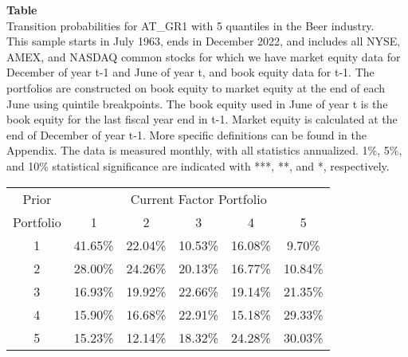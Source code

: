 \begin{table*}[ht!]
\raggedright
{}
\label{tab: transition_probs_AT_GR1_Beer_with_5_quantiles}
\textbf{Table \thetable} \\
Transition probabilities for AT_GR1 with 5 quantiles in the Beer industry. \\
\hspace*{1em}This sample starts in July 1963, ends in December 2022, and includes all NYSE, AMEX, and NASDAQ common stocks for which we have market equity data for December of year t-1 and June of year t, and book equity data for t-1. The portfolios are constructed on book equity to market equity at the end of each June using quintile breakpoints.  The book equity used in June of year t is the book equity for the last fiscal year end in t-1.  Market equity is calculated at the end of December of year t-1.  More specific definitions can be found in the Appendix.  The data is measured monthly, with all statistics annualized.  1\%, 5\%, and 10\% statistical significance are indicated with ***, **, and *, respectively. \\
\vspace{0.5em}
\centering
\begin{adjustbox}{max width=\textwidth}
\begin{tabular}{@{}cccccc@{}}
\toprule
Prior & \multicolumn{5}{c}{Current Factor Portfolio} \\
Portfolio & 1 & 2 & 3 & 4 & 5 \\
\midrule
1 & 41.65\% & 22.04\% & 10.53\% & 16.08\% & 9.70\% \\
2 & 28.00\% & 24.26\% & 20.13\% & 16.77\% & 10.84\% \\
3 & 16.93\% & 19.92\% & 22.66\% & 19.14\% & 21.35\% \\
4 & 15.90\% & 16.68\% & 22.91\% & 15.18\% & 29.33\% \\
5 & 15.23\% & 12.14\% & 18.32\% & 24.28\% & 30.03\% \\
\bottomrule
\end{tabular}
\end{adjustbox}
\end{table*}